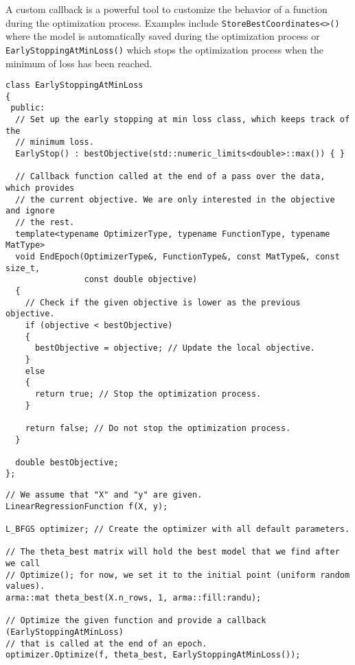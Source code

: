 \begin{itemize}
A custom callback is a powerful tool to customize the behavior of a function
during the optimization process. Examples include {\tt StoreBestCoordinates<>()}
where the model is automatically saved during the optimization process or {\tt
EarlyStoppingAtMinLoss()}  which stops the optimization process when the minimum
of loss has been reached.

\begin{verbatim}
class EarlyStoppingAtMinLoss
{
 public:
  // Set up the early stopping at min loss class, which keeps track of the
  // minimum loss.
  EarlyStop() : bestObjective(std::numeric_limits<double>::max()) { }

  // Callback function called at the end of a pass over the data, which provides
  // the current objective. We are only interested in the objective and ignore
  // the rest.
  template<typename OptimizerType, typename FunctionType, typename MatType>
  void EndEpoch(OptimizerType&, FunctionType&, const MatType&, const size_t,
                const double objective)
  {
    // Check if the given objective is lower as the previous objective.
    if (objective < bestObjective)
    {
      bestObjective = objective; // Update the local objective.
    }
    else
    {
      return true; // Stop the optimization process.
    }

    return false; // Do not stop the optimization process.
  }

  double bestObjective;
};
\end{verbatim}


\begin{verbatim}
// We assume that "X" and "y" are given.
LinearRegressionFunction f(X, y);

L_BFGS optimizer; // Create the optimizer with all default parameters.

// The theta_best matrix will hold the best model that we find after we call
// Optimize(); for now, we set it to the initial point (uniform random values).
arma::mat theta_best(X.n_rows, 1, arma::fill:randu);

// Optimize the given function and provide a callback (EarlyStoppingAtMinLoss)
// that is called at the end of an epoch.
optimizer.Optimize(f, theta_best, EarlyStoppingAtMinLoss());
\end{verbatim}

\end{itemize}
